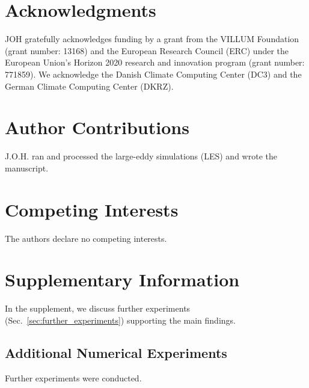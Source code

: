 \documentclass[draft,linenumbers]{agujournal2019}
\begin{document}
\section*{Acknowledgments}
\noindent
JOH gratefully acknowledges funding by a grant from the VILLUM Foundation (grant number: 13168) and the European Research Council (ERC) under the European Union's Horizon 2020 research and innovation program (grant number: 771859). 
We acknowledge the Danish Climate Computing Center (DC3) and the German Climate Computing Center (DKRZ).

\section*{Author Contributions}
\noindent
J.O.H. ran and processed the large-eddy simulations (LES) and wrote the manuscript.
\\
\section*{Competing Interests}
\noindent
The authors declare no competing interests.

\pagebreak
\clearpage

\renewcommand{\theequation}{S\arabic{equation}}
\renewcommand{\thesection}{S\arabic{section}}
\renewcommand{\thefigure}{S\arabic{figure}}

\setcounter{equation}{0}
\setcounter{figure}{0}
\setcounter{section}{0}

\section*{Supplementary Information}\label{sec:supp}
\noindent
In the supplement, we discuss further experiments (Sec.~\ref{sec:further_experiments}) supporting the main findings.

\subsection*{Additional Numerical Experiments}\label{sec:further_experiments}
Further experiments were conducted.
\end{document}
